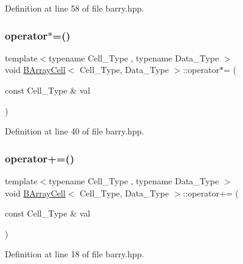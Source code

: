 Definition at line 58 of file barry.\+hpp.

\mbox{\label{classbarry_1_1_b_array_cell_abc193e5d3dd8d04e5d4bb8d808fde35d}} 
\subsubsection{\texorpdfstring{operator$\ast$=()}{operator*=()}}
{\footnotesize\ttfamily template$<$typename Cell\+\_\+\+Type , typename Data\+\_\+\+Type $>$ \\
void \hyperlink{classbarry_1_1_b_array_cell}{B\+Array\+Cell}$<$ Cell\+\_\+\+Type, Data\+\_\+\+Type $>$\+::operator$\ast$= (\begin{DoxyParamCaption}\item[{const Cell\+\_\+\+Type \&}]{val }\end{DoxyParamCaption})\hspace{0.3cm}{\ttfamily [inline]}}



Definition at line 40 of file barry.\+hpp.

\mbox{\label{classbarry_1_1_b_array_cell_a2e5c7efcf17bf4acaf17900fb781827b}} 
\subsubsection{\texorpdfstring{operator+=()}{operator+=()}}
{\footnotesize\ttfamily template$<$typename Cell\+\_\+\+Type , typename Data\+\_\+\+Type $>$ \\
void \hyperlink{classbarry_1_1_b_array_cell}{B\+Array\+Cell}$<$ Cell\+\_\+\+Type, Data\+\_\+\+Type $>$\+::operator+= (\begin{DoxyParamCaption}\item[{const Cell\+\_\+\+Type \&}]{val }\end{DoxyParamCaption})\hspace{0.3cm}{\ttfamily [inline]}}



Definition at line 18 of file barry.\+hpp.


